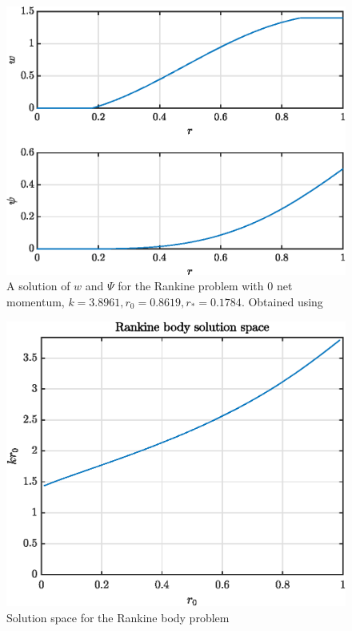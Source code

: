\documentclass{X:/Documents/Coding/Latex/myreport}
\begin{document}
\begin{figure}[h]
    \centering
    \includegraphics[width=\linewidth]{rankineExample.eps}
    \caption{A solution of $w$ and $\Psi$ for the Rankine problem with $0$ net momentum, $k = 3.8961, r_0 = 0.8619, r_* = 0.1784$. Obtained using }
    \label{fig:rankineExample}
\end{figure}



\begin{figure}[h]
    \centering
    \includegraphics[width=\linewidth]{rankineSolutionSet.eps}
    \caption{Solution space for the Rankine body problem}
    \label{fig:rankineSolutions}
\end{figure}
\end{document}
